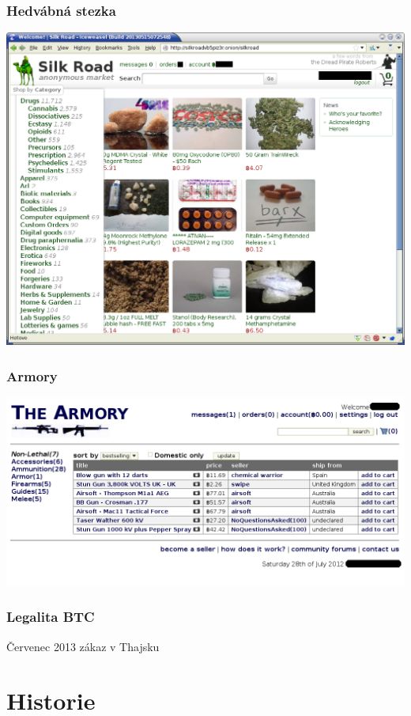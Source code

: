 \documentclass[xetex]{beamer}
\begin{document}
\begin{frame}
	\frametitle{Hedvábná stezka}
	\includegraphics[scale=0.4]{images/silkroad.png}
\end{frame}

\begin{frame}
	\frametitle{Armory}
	\includegraphics[scale=0.4]{images/armory.png}
\end{frame}

\begin{frame}
	\frametitle{Legalita BTC}
	Červenec 2013 zákaz v Thajsku
\end{frame}

\section{Historie}
\end{document}
